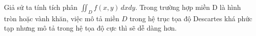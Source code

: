 \documentclass[preview]{standalone}
\begin{document}
\begin{center}
Giả sử ta tính tích phân $\iint_D f(x, y)\,dxdy$. Trong trường hợp miền D là hình tròn hoặc vành khăn, việc mô tả miền $D$ trong hệ trục tọa độ Descartes khá phức tạp nhưng mô tả trong  hệ tọa độ cực thì sẽ dễ dàng hơn.
\end{center}
\end{document}
